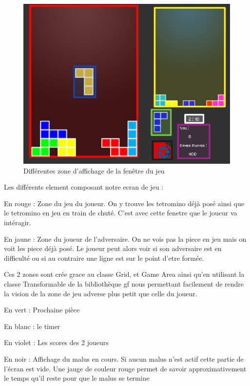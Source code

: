 \documentclass[a4paper, 12pt]{article}
\begin{document}
			\begin{figure}[bt]
				\centering
				\includegraphics[scale=0.35]{img/fenetre.png}
				\caption{Différentes zone d'affichage de la fenêtre du jeu}
				\label{fig:fen}
			\end{figure}

			Les différents element composant notre ecran de jeu : 

			En rouge : Zone du jeu du joueur. On y trouve les tetromino déjà posé ainsi que le tetromino en jeu en train de chuté. C’est avec cette fenetre que le joueur va intéragir.

			En jaune : Zone du joueur de l’adversaire. On ne vois pas la piece en jeu mais on voit les piece déjà posé. Le joueur peut alors voir si son adversaire est en difficulté ou si au contraire une ligne est sur le point d’etre formée.


			Ces 2 zones sont crée grace au classe Grid, et Game Area ainsi qu’en utilisant la classe Transformable de la bibliothèque gf nous permettant facilement de rendre la vision de la zone de jeu adverse plus petit que celle du joueur.

			En vert : Prochaine pièce

			En blanc : le timer

			En violet : Les scores des 2 joueurs

			En noir : Affichage du malus en cours. Si aucun malus n’est actif cette partie de l’écran est vide. Une jauge de couleur rouge permet de savoir approximativement le temps qu’il reste pour que le malus se termine
\end{document}

